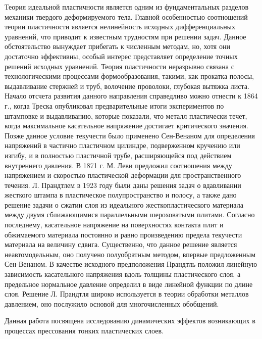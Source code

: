 
{\actuality} Теория идеальной пластичности является одним из фундаментальных разделов механики твердого деформируемого тела.
Главной особенностью соотношений теории пластичности является нелинейность исходных дифференциальных уравнений, что приводит к известным трудностям при решении задач. Данное обстоятельство вынуждает прибегать к численным методам, но, хотя они достаточно эффективны, особый интерес представляет определение точных решений исходных уравнений.
Теория пластичности неразрывно связана с технологическими процессами формообразования, такими, как прокатка полосы, выдавливание стержней и труб, волочение проволоки, глубокая вытяжка листа.
Начало отсчета развития данного направления справедливо можно отнести к 1864 г., когда Треска опубликовал предварительные итоги экспериментов по штамповке и выдавливанию, которые показали, что металл пластически течет, когда максимальное касательное напряжение достигает критического значения. Позже данное условие текучести было применено Сен-Венаном \autocite{Todhunter:1893} для определения напряжений в частично пластичном цилиндре, подверженном кручению или изгибу, и в полностью пластичной трубе, расширяющейся под действием внутреннего давления. В 1871 г. М. Леви \autocite{Levi:1871} предложил соотношения между напряжением и скоростью пластической деформации для пространственного течения. Л. Прандтлем \autocite{Prandtl:1948} в 1923 году были даны решения задач о вдавливании жесткого штампа в пластическое полупространство и полосу, а также дано решение задачи о сжатии слоя из идеального жесткопластического материала между двумя сближающимися параллельными шероховатыми плитами. Согласно последнему, касательное напряжение на поверхностях контакта плит и обжимаемого материала постоянно и равно произведению предела текучести материала на величину сдвига. Существенно, что данное решение является неавтомодельным, оно получено полуобратным методом, впервые предложенным Сен-Венаном. В качестве исходного предположения Прандтль положил линейную зависимость касательного напряжения вдоль толщины пластического слоя, а предельное нормальное давление определил в виде линейной функции по длине слоя. Решение Л. Прандтля широко используется в теории обработки металлов давлением, оно послужило основой для многочисленных обобщений.

\ifsynopsis
\nocite{Shabaykin:2021,Shabaykin:2017,Shabaykin:2018a,Shabaykin:2018b,Shabaykin:2020a,Shabaykin:2020b}
Данная работа посвящена исследованию динамических эффектов возникающих в процессах прессования тонких пластических слоев.

